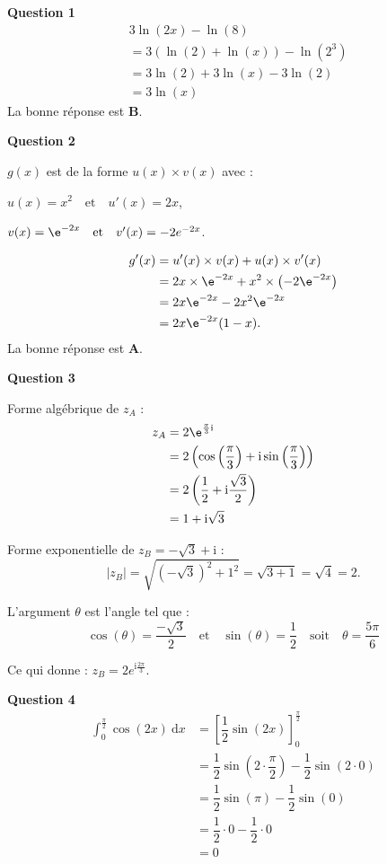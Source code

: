 \bigskip

\textbf{Question 1}
\begin{align*}
&3\ln(2x) - \ln(8) \\
&= 3(\ln(2) + \ln(x)) - \ln(2^3) \\
&= 3\ln(2) + 3\ln(x) - 3\ln(2) \\
&= 3\ln(x)
\end{align*}
La bonne réponse est \textbf{B}.

\bigskip

\textbf{Question 2}

\medskip

$g(x)$ est de la forme $u(x) \times v(x)$ avec :
\begin{list}{\textbullet}{}
\item $u(x) = x^2 \quad \text{et} \quad u'(x) = 2x$,
\item $v(x) = \e^{-2x} \quad \text{et} \quad v'(x) = -2e^{-2x}$.
\end{list}
\begin{align*}
g'(x) &= u'(x) \times v(x) + u(x) \times v'(x) \\
&= 2x \times \e^{-2x} + x^2 \times \left(-2\e^{-2x}\right) \\
&= 2x \e^{-2x} - 2x^2 \e^{-2x} \\
&= 2x \e^{-2x} (1 - x).
\end{align*}
La bonne réponse est \textbf{A}.

\bigskip

\textbf{Question 3}

\medskip

Forme algébrique de $z_A$ :
\begin{align*}
z_A &= 2\e^{\frac{\pi}{3}\text{i}} \\
&= 2 \left( \cos\left(\dfrac{\pi}{3}\right) + \text{i}\sin\left(\dfrac{\pi}{3}\right) \right) \\
&= 2 \left( \dfrac{1}{2} + \text{i}\dfrac{\sqrt{3}}{2} \right) \\
&= 1 + \text{i}\sqrt{3}
\end{align*}

Forme exponentielle de $z_B = -\sqrt{3} + \text{i}$ :
\[\left|z_B\right| = \sqrt{\left(-\sqrt{3}\right)^2 + 1^2} = \sqrt{3 + 1} = \sqrt{4} = 2.\]

L'argument $\theta$ est l’angle tel que :
\[\cos(\theta) = \frac{-\sqrt{3}}{2} \quad \text{et} \quad \sin(\theta) = \frac{1}{2} \quad \text{soit} \quad \theta = \dfrac{5\pi}{6}\]

Ce qui donne : $z_B = 2e^{\text{i}\frac{2\pi}{3}}$.

\bigskip

\textbf{Question 4}
\begin{align*}
\displaystyle\int_0^{\frac{\pi}{2}} \cos (2x) \:\text{d}x
&= \left[ \dfrac{1}{2} \sin(2x) \right]_{0}^{\frac{\pi}{2}} \\
&= \dfrac{1}{2} \sin\left(2 \cdot \dfrac{\pi}{2}\right) - \dfrac{1}{2} \sin(2 \cdot 0) \\
&= \dfrac{1}{2} \sin(\pi) - \dfrac{1}{2} \sin(0) \\
&= \dfrac{1}{2} \cdot 0 - \dfrac{1}{2} \cdot 0 \\
&= 0
\end{align*}

\bigskip
